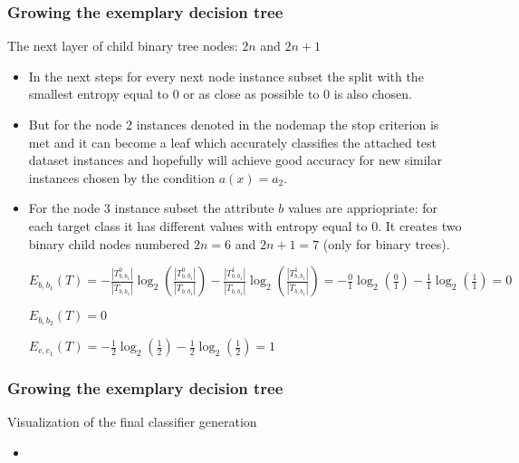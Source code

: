 \documentclass[smaller, proffesionalfonts]{beamer}
\begin{document}
\begin{frame}
\frametitle{Growing the exemplary decision tree}
\begin{block}{The next layer of child binary tree nodes: $2n$ and $2n+1$ }
\begin{itemize}
\item
\justifying
In the next steps for every next node instance subset the split with the smallest entropy equal to 0 or as close as possible to 0 is also chosen. 
\item
But for the node 2 instances denoted in the nodemap the stop criterion is met and it can become a leaf which accurately classifies the attached test dataset instances and hopefully will achieve good accuracy for new similar instances chosen by the condition $a(x)=a_2$.
\item 
For the node 3 instance subset the attribute $b$ values are appriopriate: for each target class it has different values with entropy equal to 0. It creates two binary child nodes numbered $2n=6$ and $2n+1=7$ (only for binary trees).

$E_{b,b_1}(T)= 
-\frac{|T^{0}_{b,b_1}|}{|T_{b,b_1}|}\log_2(\frac{|T^{0}_{b,b_1}|}{|T_{b,b_1}|}) 
-\frac{|T^{1}_{b,b_1}|}{|T_{b,b_1}|}\log_2(\frac{|T^{1}_{b,b_1}|}{|T_{b,b_1}|}) =
-\frac{0}{1}\log_2(\frac{0}{1})-\frac{1}{1}\log_2(\frac{1}{1})=0$

$E_{b,b_2}(T)=0$

$E_{c,c_1}(T)=-\frac{1}{2}\log_2(\frac{1}{2})-\frac{1}{2}\log_2(\frac{1}{2})=1$

\end{itemize}
\end{block}
\end{frame}

\begin{frame}
\frametitle{Growing the exemplary decision tree}
\begin{block}{Visualization of the final classifier generation}
\begin{itemize}
\item[\ ]
\begin{minipage}[t]{.45\textwidth}
\end{minipage}
\hfill
\begin{minipage}[t]{.45\textwidth}
\end{minipage}
\end{itemize}
\end{block}
\end{frame}
\end{document}
